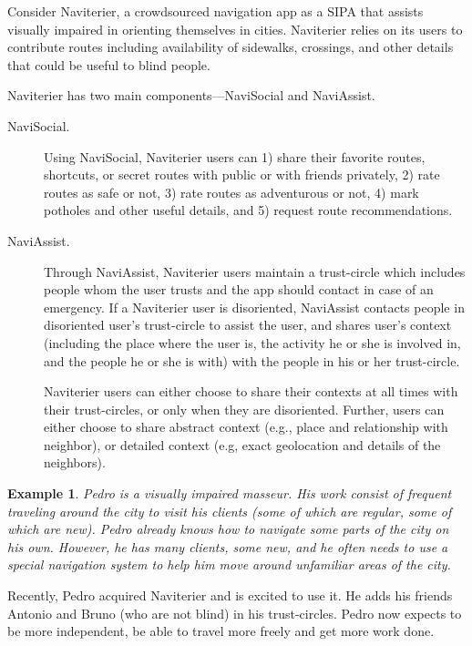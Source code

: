 \documentclass[11pt,          %
               phd,           %
               onehalfspacing %
               ]{ncsuthesis}
\newtheorem{example}{Example}
\newcommand{\navigationapp}{Naviterier\xspace}
\begin{document}
Consider \navigationapp, a crowdsourced navigation app as a SIPA that
assists visually impaired in orienting themselves in cities.
\navigationapp relies on its users to contribute routes including
availability of sidewalks, crossings, and other details that could be
useful to blind people.

\navigationapp has two main components---NaviSocial and NaviAssist. 
\begin{description}
\item[NaviSocial.] Using NaviSocial, \navigationapp users can 1) share
their favorite routes, shortcuts, or secret routes with public or with
friends privately, 2) rate routes as safe or not, 3) rate routes as
adventurous or not, 4) mark potholes and other useful details, and 5)
request route recommendations.

\item[NaviAssist.] Through NaviAssist, \navigationapp users maintain a
trust-circle which includes people whom the user trusts and the app
should contact in case of an emergency. If a \navigationapp user is
disoriented, NaviAssist contacts people in disoriented user's
trust-circle to assist the user, and shares user's context (including
the place where the user is, the activity he or she is involved in, and
the people he or she is with) with the people in his or her
trust-circle.

\navigationapp users can either choose to share their contexts at all
times with their trust-circles, or only when they are disoriented.
Further, users can either choose to share abstract context (e.g., place
and relationship with neighbor), or detailed context (e.g, exact
geolocation and details of the neighbors).
\end{description}

\begin{example}
Pedro is a visually impaired masseur. His work consist of frequent
traveling around the city to visit his clients (some of which are
regular, some of which are new). Pedro already knows how to navigate
some parts of the city on his own. However, he has many clients, some
new, and he often needs to use a special navigation system to help him
move around unfamiliar areas of the city.
\end{example}

Recently, Pedro acquired \navigationapp and is excited to use it. He
adds his friends Antonio and Bruno (who are not blind) in his
trust-circles. Pedro now expects to be more independent, be able to
travel more freely and get more work done.
\end{document}
